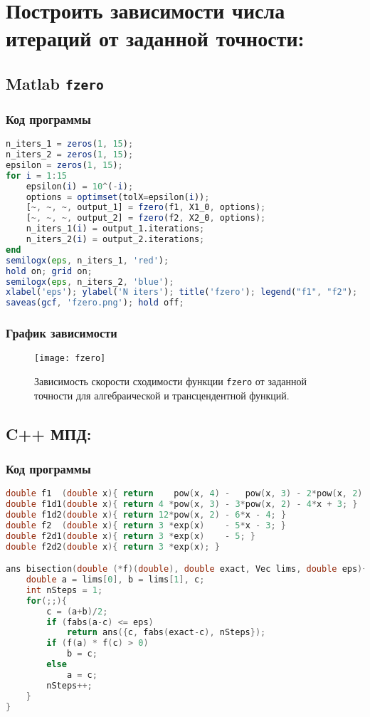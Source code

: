 \clearpage

\section{Построить зависимости числа итераций от заданной точности:}
\subsection{Matlab \texttt{fzero}}
\subsubsection{Код программы}
\begin{lstlisting}[language=Octave, firstnumber=15]
n_iters_1 = zeros(1, 15);
n_iters_2 = zeros(1, 15);
epsilon = zeros(1, 15);
for i = 1:15
    epsilon(i) = 10^(-i);
    options = optimset(tolX=epsilon(i));
    [~, ~, ~, output_1] = fzero(f1, X1_0, options);
    [~, ~, ~, output_2] = fzero(f2, X2_0, options);
    n_iters_1(i) = output_1.iterations;
    n_iters_2(i) = output_2.iterations;
end
semilogx(eps, n_iters_1, 'red');
hold on; grid on;
semilogx(eps, n_iters_2, 'blue');
xlabel('eps'); ylabel('N iters'); title('fzero'); legend("f1", "f2");
saveas(gcf, 'fzero.png'); hold off;
\end{lstlisting}
\subsubsection{График зависимости}
\begin{figure}[H]
    \centering
    \caption{Зависимость скорости сходимости функции \texttt{fzero} от заданной точности для алгебраической и трансцендентной функций.}
    \label{fig:pic3}
    \texttt{[image: fzero]}
\end{figure}

\clearpage

\subsection{C++ МПД:}
\subsubsection{Код программы}
\begin{lstlisting}[language=c++]
double f1  (double x){ return    pow(x, 4) -   pow(x, 3) - 2*pow(x, 2) + 3*x - 3; }
double f1d1(double x){ return 4 *pow(x, 3) - 3*pow(x, 2) - 4*x + 3; }
double f1d2(double x){ return 12*pow(x, 2) - 6*x - 4; }
double f2  (double x){ return 3 *exp(x)    - 5*x - 3; }
double f2d1(double x){ return 3 *exp(x)    - 5; }
double f2d2(double x){ return 3 *exp(x); }

ans bisection(double (*f)(double), double exact, Vec lims, double eps){
    double a = lims[0], b = lims[1], c;
    int nSteps = 1;
    for(;;){
        c = (a+b)/2;
        if (fabs(a-c) <= eps)
            return ans({c, fabs(exact-c), nSteps});
        if (f(a) * f(c) > 0)
            b = c;
        else
            a = c;
        nSteps++;
    }
}
\end{lstlisting}
